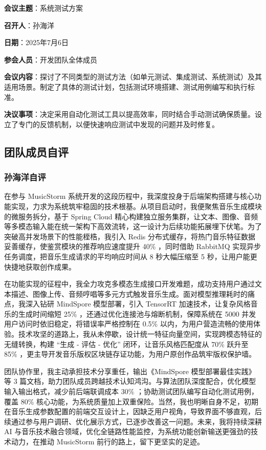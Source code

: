 \documentclass{base}
\numberwithin{figure}{section} %
\begin{document}
\textbf{会议主题}：系统测试方案

\textbf{召开人}：孙海洋

\textbf{日期}：2025年7月6日

\textbf{参会人员}：开发团队全体成员

\textbf{会议内容}：探讨了不同类型的测试方法（如单元测试、集成测试、系统测试）及其适用场景。制定了具体的测试计划，包括测试环境搭建、测试用例编写和执行标准。

\textbf{决议事项}：决定采用自动化测试工具以提高效率，同时结合手动测试确保质量。设立了专门的反馈机制，以便快速响应测试中发现的问题并及时修复。

\subsection{团队成员自评}

\newpage

\subsubsection{孙海洋自评}

在参与 MusicStorm 系统开发的这段历程中，我深度投身于后端架构搭建与核心功能实现，力求为系统筑牢稳固的技术根基。从项目启动时，我便聚焦音乐生成模块的微服务拆分，基于 Spring Cloud 精心构建独立服务集群，让文本、图像、音频等多模态输入能在统一架构下高效流转，这一设计为后续功能拓展埋下伏笔。为了突破高并发场景下的性能桎梏，我引入 Redis 分布式缓存，将热门音乐特征数据妥善缓存，使鉴赏模块的推荐响应速度提升 40\% ，同时借助 RabbitMQ 实现异步任务调度，把音乐生成请求的平均响应时间从 8 秒大幅压缩至 5 秒，让用户能更快捷地获取创作成果。

在功能实现的征程中，我全力攻克多模态生成接口开发难题，成功支持用户通过文本描述、图像上传、音频哼唱等多元方式触发音乐生成。面对模型推理耗时的痛点，我深入钻研 MindSpore 模型部署，引入 TensorRT 加速技术，让复杂风格音乐的生成时间缩短 25\% ，还通过优化连接池与熔断机制，保障系统在 5000 并发用户访问时依旧稳定，将错误率严格控制在 0.5\% 以内，为用户营造流畅的使用体验。技术攻坚的道路上，我从未停歇，设计统一特征向量空间，实现跨模态特征的无缝转换，构建 “生成 - 评估 - 优化” 闭环，让音乐风格匹配度从 70\% 跃升至 85\% ，更主导开发音乐版权区块链存证功能，为用户原创作品筑牢版权保护墙。

团队协作里，我主动承担技术分享重任，输出《MindSpore 模型部署最佳实践》等 3 篇文档，助力团队成员跨越技术认知鸿沟。与算法团队深度配合，优化模型输入输出格式，减少前后端联调成本 30\% ；协助测试团队编写自动化测试用例，覆盖 80\% 核心功能，为系统质量加上双重保险。当然，我也明晰自身不足，初期在音乐生成参数配置的前端交互设计上，因缺乏用户视角，导致界面不够直观，后续通过参与用户调研、优化展示方式，已逐步改善这一问题。未来，我将持续深耕 AI 与音乐技术融合领域，优化全链路性能监控，为系统功能创新输送更强劲的技术动力，在推动 MusicStorm 前行的路上，留下更坚实的足迹。
\end{document}
